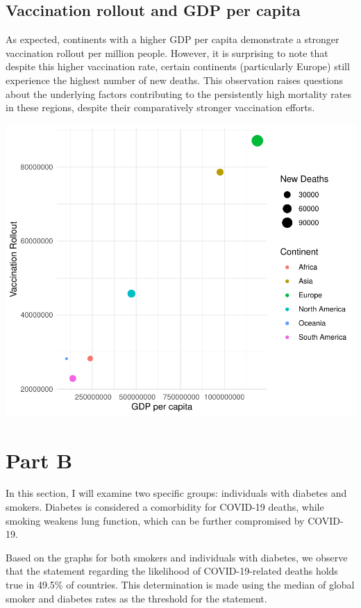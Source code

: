 \documentclass[11pt,preprint, authoryear]{elsarticle}
\numberwithin{equation}{section}
\numberwithin{figure}{section}
\numberwithin{table}{section}
\begin{document}
\hypertarget{vaccination-rollout-and-gdp-per-capita}{%
\subsection{Vaccination rollout and GDP per
capita}\label{vaccination-rollout-and-gdp-per-capita}}

As expected, continents with a higher GDP per capita demonstrate a
stronger vaccination rollout per million people. However, it is
surprising to note that despite this higher vaccination rate, certain
continents (particularly Europe) still experience the highest number of
new deaths. This observation raises questions about the underlying
factors contributing to the persistently high mortality rates in these
regions, despite their comparatively stronger vaccination efforts.

\includegraphics{Question1_files/figure-latex/unnamed-chunk-2-1.pdf}

\hypertarget{part-b}{%
\section{Part B}\label{part-b}}

In this section, I will examine two specific groups: individuals with
diabetes and smokers. Diabetes is considered a comorbidity for COVID-19
deaths, while smoking weakens lung function, which can be further
compromised by COVID-19.

Based on the graphs for both smokers and individuals with diabetes, we
observe that the statement regarding the likelihood of COVID-19-related
deaths holds true in 49.5\% of countries. This determination is made
using the median of global smoker and diabetes rates as the threshold
for the statement.
\end{document}
